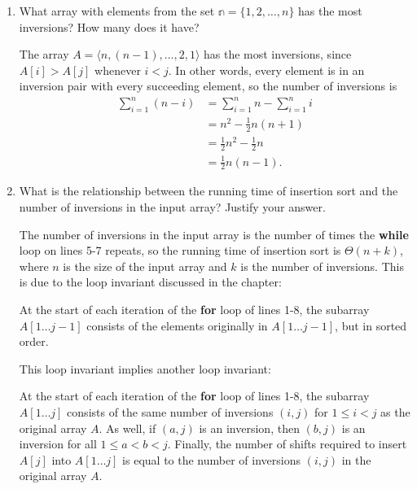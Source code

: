 \documentclass[Chapter02]{subfiles}
\begin{document}
\begin{enumerate}[leftmargin=\labelsep,label={\textbf{\thesection-\arabic*}}]
\begin{enumerate}
			\item What array with elements from the set $\mathbb{n} = \{1, 2, \dots, n\}$ has the most inversions? How many does it have?
			\begin{answer}
				The array $A = \langle n, (n - 1), \dots, 2, 1 \rangle$ has the most inversions, since $A[i] > A[j]$ whenever $i < j$. In other words, every element is in an inversion pair with every succeeding element, so the number of inversions is
				\begin{align*}
					\sum_{i = 1}^n (n - i) &= \sum_{i = 1}^n n - \sum_{i = 1}^n i\\
						&= n^2 - \frac{1}{2}n(n + 1)\\
						&= \frac{1}{2}n^2 - \frac{1}{2}n\\
						&= \frac{1}{2}n(n - 1).
				\end{align*}
			\end{answer}
			
			\item What is the relationship between the running time of insertion sort and the number of inversions in the input array? Justify your answer.
			\begin{answer}
				The number of inversions in the input array is the number of times the \textbf{while} loop on lines 5-7 repeats, so the running time of insertion sort is $\Theta(n + k)$, where $n$ is the size of the input array and $k$ is the number of inversions. This is due to the loop invariant discussed in the chapter:
				\begin{addmargin}[2em]{2em}
					At the start of each iteration of the \textbf{for} loop of lines 1-8, the subarray $A[1 \dots j-1]$ consists of the elements originally in $A[1 \dots j-1]$, but in sorted order.
				\end{addmargin}

				This loop invariant implies another loop invariant:
				\begin{addmargin}[2em]{2em}
					At the start of each iteration of the \textbf{for} loop of lines 1-8, the subarray $A[1 \dots j]$ consists of the same number of inversions $(i,j)$ for $1 \leq i < j$ as the original array $A$. As well, if $(a,j)$ is an inversion, then $(b,j)$ is an inversion for all $1 \leq a < b < j$. Finally, the number of shifts required to insert $A[j]$ into $A[1 \dots j]$ is equal to the number of inversions $(i,j)$ in the original array $A$.
				\end{addmargin}


\end{answer}
\end{enumerate}
\end{enumerate}
\end{document}
